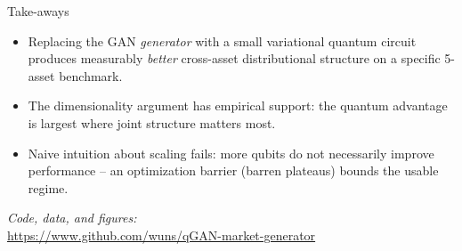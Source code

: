 \begin{frame}{Take-aways}
    \begin{itemize}
        \item Replacing the GAN \emph{generator} with a small
        variational quantum circuit produces measurably \emph{better} cross-asset distributional structure on a specific 5-asset benchmark.

        \item The dimensionality argument has empirical support:
        the quantum advantage is largest where joint structure
        matters most.

        \item Naive intuition about scaling fails:
        more qubits do not necessarily improve performance --
        an optimization barrier (barren plateaus) bounds
        the usable regime.

    \end{itemize}
    \medskip

    \begin{center}
    \emph{Code, data, and figures:}\\
    \url{https://www.github.com/wuns/qGAN-market-generator}
    \end{center}
\end{frame}
